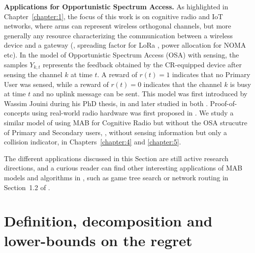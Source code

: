 \textbf{Applications for Opportunistic Spectrum Access.}
%
As highlighted in Chapter~\ref{chapter:1},
the focus of this work is on cognitive radio and IoT networks, where arms can represent wireless orthogonal channels, but more generally any resource characterizing the communication between a wireless device and a gateway (\eg, spreading factor for LoRa \cite{KerkoucheAlami18}, power allocation for NOMA etc).
%
In the model of Opportunistic Spectrum Access (OSA) with sensing, the samples $Y_{k,t}$ represents the feedback obtained by the CR-equipped device after sensing the channel $k$ at time $t$.
A reward of $r(t) = 1$ indicates that no Primary User was sensed, while a reward of $r(t)=0$ indicates that the channel $k$ is busy at time $t$ and no uplink message can be sent.
%
This model was first introduced by Wassim Jouini during his PhD thesis,
in \cite{Jouini09} and later studied in both \cite{Jouini10,Jouini12}.
Proof-of-concepts using real-world radio hardware was first proposed in \cite{MoyWSR2014,RobertSDR2014}.
%
We study a similar model of using MAB for Cognitive Radio but without the OSA strucutre of Primary and Secondary users, \ie, without sensing information but only a collision indicator, in Chapters~\ref{chapter:4} and \ref{chapter:5}.


The different applications discussed in this Section are still active research directions,
and a curious reader can find other interesting applications of MAB models and algorithms in \cite{bouneffouf2019survey}, such as game tree search or network routing in Section~1.2 of \cite{LattimoreBanditAlgorithmsBook}.


\section{Definition, decomposition and lower-bounds on the regret}
\label{sec:2:lowerUpperBoundsRegret}


